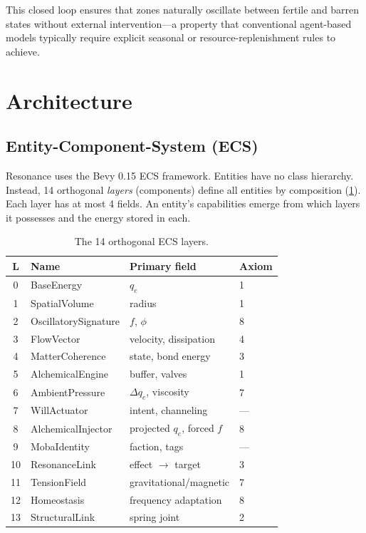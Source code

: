 \documentclass[11pt,a4paper]{article}
\begin{document}
This closed loop ensures that zones naturally oscillate between
fertile and barren states without external intervention---a
property that conventional agent-based models typically
require explicit seasonal or resource-replenishment rules to
achieve.

\section{Architecture}
\label{sec:architecture}

\subsection{Entity-Component-System (ECS)}

Resonance uses the Bevy 0.15 ECS framework.
Entities have no class hierarchy. Instead, 14 orthogonal
\emph{layers} (components) define all entities by composition
(\cref{tab:layers}). Each layer has at most 4 fields.
An entity's capabilities emerge from which layers it possesses
and the energy stored in each.

\begin{table}[h]
\centering
\caption{The 14 orthogonal ECS layers.}
\label{tab:layers}
\small
\begin{tabular}{@{}clll@{}}
\toprule
\textbf{L} & \textbf{Name} & \textbf{Primary field} & \textbf{Axiom} \\
\midrule
0 & BaseEnergy & $q_e$ & 1 \\
1 & SpatialVolume & radius & 1 \\
2 & OscillatorySignature & $f$, $\phi$ & 8 \\
3 & FlowVector & velocity, dissipation & 4 \\
4 & MatterCoherence & state, bond energy & 3 \\
5 & AlchemicalEngine & buffer, valves & 1 \\
6 & AmbientPressure & $\Delta q_e$, viscosity & 7 \\
7 & WillActuator & intent, channeling & --- \\
8 & AlchemicalInjector & projected $q_e$, forced $f$ & 8 \\
9 & MobaIdentity & faction, tags & --- \\
10 & ResonanceLink & effect $\to$ target & 3 \\
11 & TensionField & gravitational/magnetic & 7 \\
12 & Homeostasis & frequency adaptation & 8 \\
13 & StructuralLink & spring joint & 2 \\
\bottomrule
\end{tabular}
\end{table}
\end{document}
